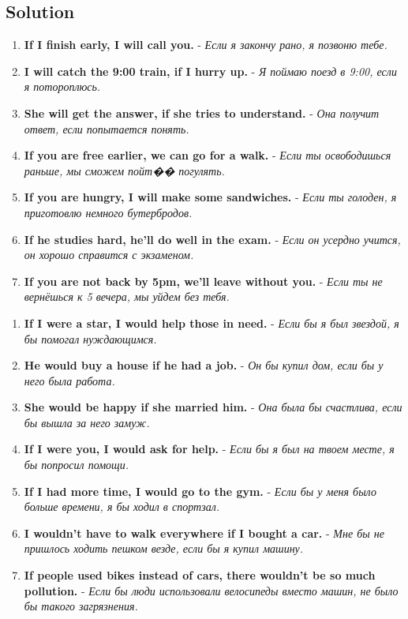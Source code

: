 \subsection*{Solution}
\begin{enumerate}
      \item \textbf{If I finish early, I will call you.} - \textit{Если я закончу рано, я позвоню тебе.}
      \item \textbf{I will catch the 9:00 train, if I hurry up.} - \textit{Я поймаю поезд в 9:00, если я потороплюсь.}
      \item \textbf{She will get the answer, if she tries to understand.} - \textit{Она получит ответ, если попытается понять.}
      \item \textbf{If you are free earlier, we can go for a walk.} - \textit{Если ты освободишься раньше, мы сможем пойт�� погулять.}
      \item \textbf{If you are hungry, I will make some sandwiches.} - \textit{Если ты голоден, я приготовлю немного бутербродов.}
      \item \textbf{If he studies hard, he’ll do well in the exam.} - \textit{Если он усердно учится, он хорошо справится с экзаменом.}
      \item \textbf{If you are not back by 5pm, we’ll leave without you.} - \textit{Если ты не вернёшься к 5 вечера, мы уйдем без тебя.}
\end{enumerate}

\begin{enumerate}
      \item \textbf{If I were a star, I would help those in need.} - \textit{Если бы я был звездой, я бы помогал нуждающимся.}
      \item \textbf{He would buy a house if he had a job.} - \textit{Он бы купил дом, если бы у него была работа.}
      \item \textbf{She would be happy if she married him.} - \textit{Она была бы счастлива, если бы вышла за него замуж.}
      \item \textbf{If I were you, I would ask for help.} - \textit{Если бы я был на твоем месте, я бы попросил помощи.}
      \item \textbf{If I had more time, I would go to the gym.} - \textit{Если бы у меня было больше времени, я бы ходил в спортзал.}
      \item \textbf{I wouldn’t have to walk everywhere if I bought a car.} - \textit{Мне бы не пришлось ходить пешком везде, если бы я купил машину.}
      \item \textbf{If people used bikes instead of cars, there wouldn’t be so much pollution.} - \textit{Если бы люди использовали велосипеды вместо машин, не было бы такого загрязнения.}
\end{enumerate}

